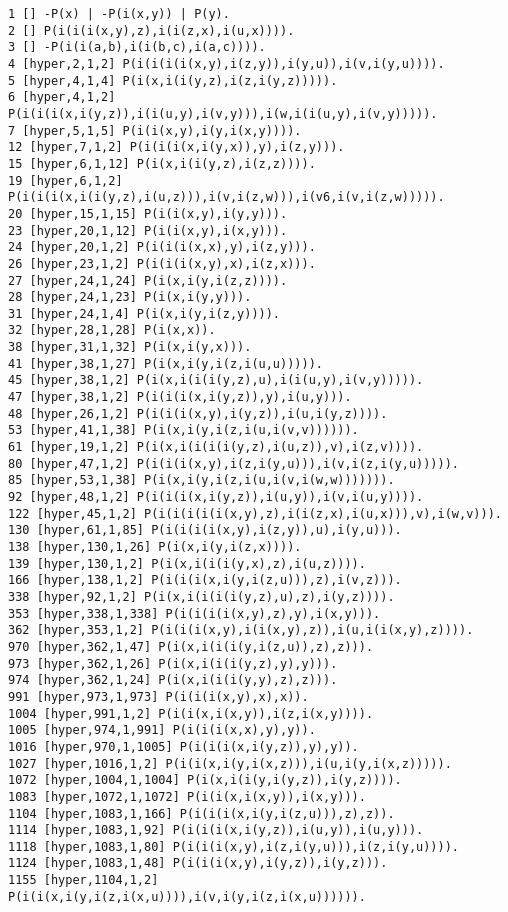 {\begin{verbatim}
1 [] -P(x) | -P(i(x,y)) | P(y).
2 [] P(i(i(i(x,y),z),i(i(z,x),i(u,x)))).
3 [] -P(i(i(a,b),i(i(b,c),i(a,c)))).
4 [hyper,2,1,2] P(i(i(i(i(x,y),i(z,y)),i(y,u)),i(v,i(y,u)))).
5 [hyper,4,1,4] P(i(x,i(i(y,z),i(z,i(y,z))))).
6 [hyper,4,1,2] P(i(i(i(x,i(y,z)),i(i(u,y),i(v,y))),i(w,i(i(u,y),i(v,y))))).
7 [hyper,5,1,5] P(i(i(x,y),i(y,i(x,y)))).
12 [hyper,7,1,2] P(i(i(i(x,i(y,x)),y),i(z,y))).
15 [hyper,6,1,12] P(i(x,i(i(y,z),i(z,z)))).
19 [hyper,6,1,2] P(i(i(i(x,i(i(y,z),i(u,z))),i(v,i(z,w))),i(v6,i(v,i(z,w))))).
20 [hyper,15,1,15] P(i(i(x,y),i(y,y))).
23 [hyper,20,1,12] P(i(i(x,y),i(x,y))).
24 [hyper,20,1,2] P(i(i(i(x,x),y),i(z,y))).
26 [hyper,23,1,2] P(i(i(i(x,y),x),i(z,x))).
27 [hyper,24,1,24] P(i(x,i(y,i(z,z)))).
28 [hyper,24,1,23] P(i(x,i(y,y))).
31 [hyper,24,1,4] P(i(x,i(y,i(z,y)))).
32 [hyper,28,1,28] P(i(x,x)).
38 [hyper,31,1,32] P(i(x,i(y,x))).
41 [hyper,38,1,27] P(i(x,i(y,i(z,i(u,u))))).
45 [hyper,38,1,2] P(i(x,i(i(i(y,z),u),i(i(u,y),i(v,y))))).
47 [hyper,38,1,2] P(i(i(i(x,i(y,z)),y),i(u,y))).
48 [hyper,26,1,2] P(i(i(i(x,y),i(y,z)),i(u,i(y,z)))).
53 [hyper,41,1,38] P(i(x,i(y,i(z,i(u,i(v,v)))))).
61 [hyper,19,1,2] P(i(x,i(i(i(i(y,z),i(u,z)),v),i(z,v)))).
80 [hyper,47,1,2] P(i(i(i(x,y),i(z,i(y,u))),i(v,i(z,i(y,u))))).
85 [hyper,53,1,38] P(i(x,i(y,i(z,i(u,i(v,i(w,w))))))).
92 [hyper,48,1,2] P(i(i(i(x,i(y,z)),i(u,y)),i(v,i(u,y)))).
122 [hyper,45,1,2] P(i(i(i(i(i(x,y),z),i(i(z,x),i(u,x))),v),i(w,v))).
130 [hyper,61,1,85] P(i(i(i(i(x,y),i(z,y)),u),i(y,u))).
138 [hyper,130,1,26] P(i(x,i(y,i(z,x)))).
139 [hyper,130,1,2] P(i(x,i(i(i(y,x),z),i(u,z)))).
166 [hyper,138,1,2] P(i(i(i(x,i(y,i(z,u))),z),i(v,z))).
338 [hyper,92,1,2] P(i(x,i(i(i(i(y,z),u),z),i(y,z)))).
353 [hyper,338,1,338] P(i(i(i(i(x,y),z),y),i(x,y))).
362 [hyper,353,1,2] P(i(i(i(x,y),i(i(x,y),z)),i(u,i(i(x,y),z)))).
970 [hyper,362,1,47] P(i(x,i(i(i(y,i(z,u)),z),z))).
973 [hyper,362,1,26] P(i(x,i(i(i(y,z),y),y))).
974 [hyper,362,1,24] P(i(x,i(i(i(y,y),z),z))).
991 [hyper,973,1,973] P(i(i(i(x,y),x),x)).
1004 [hyper,991,1,2] P(i(i(x,i(x,y)),i(z,i(x,y)))).
1005 [hyper,974,1,991] P(i(i(i(x,x),y),y)).
1016 [hyper,970,1,1005] P(i(i(i(x,i(y,z)),y),y)).
1027 [hyper,1016,1,2] P(i(i(x,i(y,i(x,z))),i(u,i(y,i(x,z))))).
1072 [hyper,1004,1,1004] P(i(x,i(i(y,i(y,z)),i(y,z)))).
1083 [hyper,1072,1,1072] P(i(i(x,i(x,y)),i(x,y))).
1104 [hyper,1083,1,166] P(i(i(i(x,i(y,i(z,u))),z),z)).
1114 [hyper,1083,1,92] P(i(i(i(x,i(y,z)),i(u,y)),i(u,y))).
1118 [hyper,1083,1,80] P(i(i(i(x,y),i(z,i(y,u))),i(z,i(y,u)))).
1124 [hyper,1083,1,48] P(i(i(i(x,y),i(y,z)),i(y,z))).
1155 [hyper,1104,1,2] P(i(i(x,i(y,i(z,i(x,u)))),i(v,i(y,i(z,i(x,u)))))).

\end{verbatim}}
